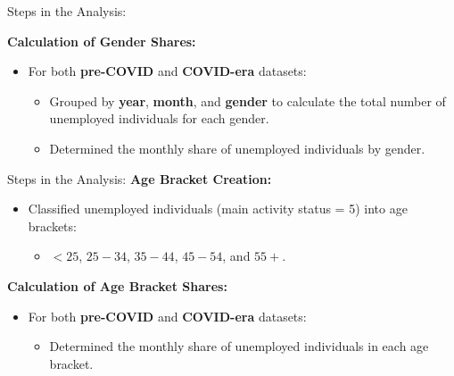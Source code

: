 \documentclass[
	11pt, %
]{beamer}
\begin{document}
\begin{frame}{Steps in the Analysis:}

    \textbf{Calculation of Gender Shares:}
    \begin{itemize}
        \item For both \textbf{pre-COVID} and \textbf{COVID-era} datasets:
        \begin{itemize}
            \item Grouped by \textbf{year}, \textbf{month}, and \textbf{gender} to calculate the total number of unemployed individuals for each gender.
            \item Determined the monthly share of unemployed individuals by gender.
        \end{itemize}
    \end{itemize}
\end{frame}

\begin{frame}{Steps in the Analysis:}
    \textbf{Age Bracket Creation:}
    \begin{itemize}
        \item Classified unemployed individuals (main activity status = 5) into age brackets:
        \begin{itemize}
            \item \textbf{$<25$}, \textbf{$25-34$}, \textbf{$35-44$}, \textbf{$45-54$}, and \textbf{$55+$}.
        \end{itemize}
    \end{itemize}
    
    \textbf{Calculation of Age Bracket Shares:}
    \begin{itemize}
        \item For both \textbf{pre-COVID} and \textbf{COVID-era} datasets:
        \begin{itemize}
            \item Determined the monthly share of unemployed individuals in each age bracket.
        \end{itemize}
    \end{itemize}
\end{frame}
\end{document}
